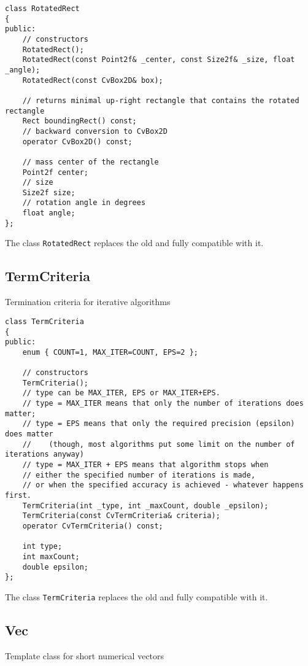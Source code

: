 \begin{lstlisting}
class RotatedRect
{
public:
    // constructors
    RotatedRect();
    RotatedRect(const Point2f& _center, const Size2f& _size, float _angle);
    RotatedRect(const CvBox2D& box);
    
    // returns minimal up-right rectangle that contains the rotated rectangle
    Rect boundingRect() const;
    // backward conversion to CvBox2D
    operator CvBox2D() const;
    
    // mass center of the rectangle
    Point2f center;
    // size
    Size2f size;
    // rotation angle in degrees
    float angle;
};
\end{lstlisting}

The class \texttt{RotatedRect} replaces the old  and fully compatible with it.

\subsection{TermCriteria}\label{TermCriteria}

Termination criteria for iterative algorithms

\begin{lstlisting}
class TermCriteria
{
public:
    enum { COUNT=1, MAX_ITER=COUNT, EPS=2 };

    // constructors
    TermCriteria();
    // type can be MAX_ITER, EPS or MAX_ITER+EPS.
    // type = MAX_ITER means that only the number of iterations does matter;
    // type = EPS means that only the required precision (epsilon) does matter
    //    (though, most algorithms put some limit on the number of iterations anyway)
    // type = MAX_ITER + EPS means that algorithm stops when
    // either the specified number of iterations is made,
    // or when the specified accuracy is achieved - whatever happens first.
    TermCriteria(int _type, int _maxCount, double _epsilon);
    TermCriteria(const CvTermCriteria& criteria);
    operator CvTermCriteria() const;

    int type;
    int maxCount;
    double epsilon;
};
\end{lstlisting}

The class \texttt{TermCriteria} replaces the old  and fully compatible with it.


\subsection{Vec}\label{Vec}
Template class for short numerical vectors


